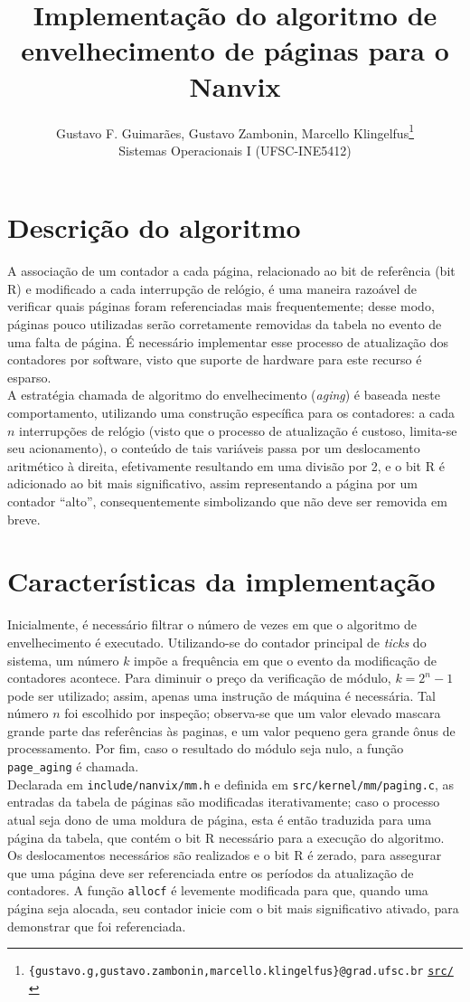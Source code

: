 \documentclass[12pt]{article}
\title{\textbf{Implementação do algoritmo de envelhecimento
  de páginas para o Nanvix}}
\author{
  Gustavo F. Guimarães, Gustavo Zambonin, Marcello Klingelfus\thanks{
    \texttt{\{gustavo.g,gustavo.zambonin,marcello.klingelfus\}@grad.ufsc.br}
    \hfill \texttt{\href{https://github.com/zambonin/nanvix}{src/}}
  } \\
  \small{Sistemas Operacionais I (UFSC-INE5412)}
}
\date{}
\begin{document}
\maketitle

\section{Descrição do algoritmo}

A associação de um contador a cada página, relacionado ao bit de referência
(bit R) e modificado a cada interrupção de relógio, é uma maneira razoável de
verificar quais páginas foram referenciadas mais frequentemente; desse modo,
páginas pouco utilizadas serão corretamente removidas da tabela no evento de
uma falta de página. É necessário implementar esse processo de atualização dos
contadores por software, visto que suporte de hardware para este recurso é
esparso. \\

A estratégia chamada de algoritmo do envelhecimento (\emph{aging}) é baseada
neste comportamento, utilizando uma construção específica para os contadores: a
cada $n$ interrupções de relógio (visto que o processo de atualização é
custoso, limita-se seu acionamento), o conteúdo de tais variáveis passa por um
deslocamento aritmético à direita, efetivamente resultando em uma divisão por
2, e o bit R é adicionado ao bit mais significativo, assim representando a
página por um contador ``alto'', consequentemente simbolizando que não deve ser
removida em breve.

\section{Características da implementação}

Inicialmente, é necessário filtrar o número de vezes em que o algoritmo de
envelhecimento é executado. Utilizando-se do contador principal de \emph{ticks}
do sistema, um número $k$ impõe a frequência em que o evento da modificação de
contadores acontece. Para diminuir o preço da verificação de módulo,
$k = 2^n - 1$ pode ser utilizado; assim, apenas uma instrução de máquina é
necessária. Tal número $n$ foi escolhido por inspeção; observa-se que um valor
elevado mascara grande parte das referências às paginas, e um valor pequeno
gera grande ônus de processamento. Por fim, caso o resultado do módulo seja
nulo, a função \texttt{page\_aging} é chamada. \\

Declarada em \texttt{include/nanvix/mm.h} e definida em
\texttt{src/kernel/mm/paging.c}, as entradas da tabela de páginas são
modificadas iterativamente; caso o processo atual seja dono de uma moldura de
página, esta é então traduzida para uma página da tabela, que contém o bit R
necessário para a execução do algoritmo. Os deslocamentos necessários são
realizados e o bit R é zerado, para assegurar que uma página deve ser
referenciada entre os períodos da atualização de contadores. A função
\texttt{allocf} é levemente modificada para que, quando uma página seja
alocada, seu contador inicie com o bit mais significativo ativado, para
demonstrar que foi referenciada.
\end{document}
